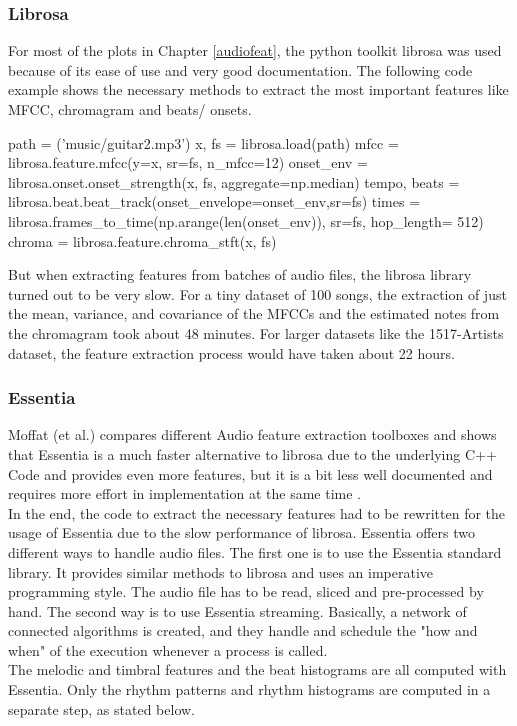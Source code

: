 \subsubsection{Librosa}

For most of the plots in Chapter \ref{audiofeat}, the python toolkit librosa was used because of its ease of use and very good documentation. The following code example shows the necessary methods to extract the most important features like MFCC, chromagram and beats/ onsets.
\lstset{language=Python} 
\begin{pythonCode}[frame=single,label={lst:Librosa},caption={librosa},captionpos=b]
path = ('music/guitar2.mp3')
x, fs = librosa.load(path)
mfcc = librosa.feature.mfcc(y=x, sr=fs, n_mfcc=12)
onset_env = librosa.onset.onset_strength(x, fs, aggregate=np.median)
tempo, beats = librosa.beat.beat_track(onset_envelope=onset_env,sr=fs)
times = librosa.frames_to_time(np.arange(len(onset_env)), sr=fs, hop_length= 512)
chroma = librosa.feature.chroma_stft(x, fs)
\end{pythonCode}	
But when extracting features from batches of audio files, the librosa library turned out to be very slow. For a tiny dataset of 100 songs, the extraction of just the mean, variance, and covariance of the MFCCs and the estimated notes from the chromagram took about 48 minutes. 
For larger datasets like the 1517-Artists dataset, the feature extraction process would have taken about 22 hours. 

\subsubsection{Essentia}

Moffat (et al.) compares different Audio feature extraction toolboxes and shows that Essentia is a much faster alternative to librosa due to the underlying C++ Code and provides even more features, but it is a bit less well documented and requires more effort in implementation at the same time \cite{audiofeattoolb}.\\ 
In the end, the code to extract the necessary features had to be rewritten for the usage of Essentia due to the slow performance of librosa. Essentia offers two different ways to handle audio files. The first one is to use the Essentia standard library. It provides similar methods to librosa and uses an imperative programming style. The audio file has to be read, sliced and pre-processed by hand. The second way is to use Essentia streaming. Basically, a network of connected algorithms is created, and they handle and schedule the "how and when" of the execution whenever a process is called. \\
The melodic and timbral features and the beat histograms are all computed with Essentia. Only the rhythm patterns and rhythm histograms are computed in a separate step, as stated below. 

